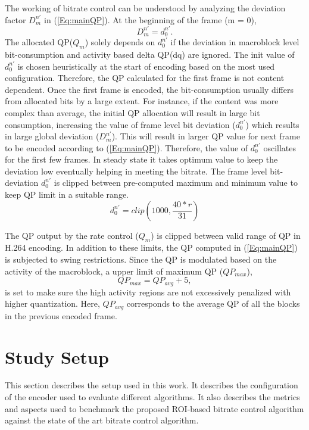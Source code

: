 \documentclass[11pt]{article} %
\begin{document}
The working of bitrate control can be understood by analyzing the deviation factor $D_m^{n'}$ in (\ref{Eq:mainQP}). At the beginning of the frame (m = 0), $$D_m^{n'} = d_0^{n'}.$$ 
The allocated QP($Q_m$) solely depends on $d_0^{n'}$ if the deviation in macroblock level bit-consumption and activity based delta QP(dq) are ignored. The init value of $d_0^{n'}$ is chosen heuristically at the start of encoding based on the most used configuration. Therefore, the QP calculated for the first frame is not content dependent. Once the first frame is encoded, the bit-consumption usually differs from allocated bits by a large extent. For instance, if the content was more complex than average, the initial QP allocation will result in large bit consumption, increasing the value of frame level bit deviation ($d_0^{n'}$) which results in large global deviation ($D_m^{n'}$). This will result in larger QP value for next frame to be encoded according to (\ref{Eq:mainQP}). Therefore, the value of $d_0^{n'}$ oscillates for the first few frames. In steady state it takes optimum value to keep the deviation low eventually helping in meeting the bitrate. The frame level bit-deviation $d_0^{n'}$ is clipped between pre-computed maximum and minimum value to keep QP limit in a suitable range.
\begin{equation}
\label{Eq:DevClip}
d_0^{n'} = clip(1000, \frac{40 * r}{31})
\end{equation}

The QP output by the rate control ($Q_m$) is clipped between valid range of QP in H.264 encoding. In addition to these limits, the QP computed in (\ref{Eq:mainQP}) is subjected to swing restrictions. Since the QP is modulated based on the activity of the macroblock, a upper limit of maximum QP ($QP_{max}$),
\begin{equation}
	\label{Eq:QP swing restriction}
	QP_{max} = QP_{avg} + 5,
\end{equation} 
is set to make sure the high activity regions are not excessively penalized with higher quantization. Here, $QP_{avg}$ corresponds to the average QP of all the blocks in the previous encoded frame.
\clearpage
\section{Study Setup}
This section describes the setup used in this work. It describes the configuration of the encoder used to evaluate different algorithms. It also describes the metrics and aspects used to benchmark the proposed ROI-based bitrate control algorithm against the state of the art bitrate control algorithm.
\end{document}

